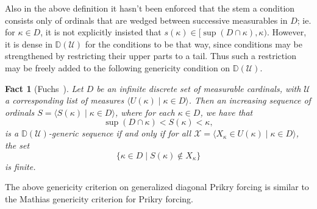 \documentclass{amsart}
\newtheorem{fact}[theorem]{Fact}
\theoremstyle{definition}
\theoremstyle{remark}
\newcommand{\D}{\mathbb{D}}
\newcommand{\U}{\mathcal{U}}
\begin{document}
Also in the above definition it hasn't been enforced that the stem a condition consists only of ordinals that are wedged between successive measurables in $D$; ie. for $\kappa \in D$, it is not explicitly insisted that $s(\kappa) \in [\sup(D\cap \kappa), \kappa)$. However, it is dense in $\D(\U)$ for the conditions to be that way, since conditions may be strengthened by restricting their upper parts to a tail. 
Thus such a restriction may be freely added to the following genericity condition on $\D(\U)$.

\begin{fact}[Fuchs~\cite{Fuchs:2005kx}] \label{fact:diagprikrymathias} Let $D$ be an infinite discrete set of measurable cardinals, with $\U$ a corresponding list of measures $\langle U(\kappa) \;|\; \kappa \in D \rangle$. Then an increasing sequence of ordinals $S = \langle S(\kappa) \;|\; \kappa \in D \rangle$, where for each $\kappa \in D$, we have that $$\sup(D \cap \kappa) < S(\kappa) < \kappa,$$ is a $\D(\U)$-generic  sequence if and only if for all $\mathcal X = \langle X_\kappa \in U(\kappa) \;|\; \kappa \in D \rangle$, the set $$\{ \kappa \in D \;|\; S(\kappa) \notin X_\kappa\}$$ is finite.
\end{fact}

The above genericity criterion on generalized diagonal Prikry forcing is similar to the Mathias genericity criterion for Prikry forcing.
\end{document}
